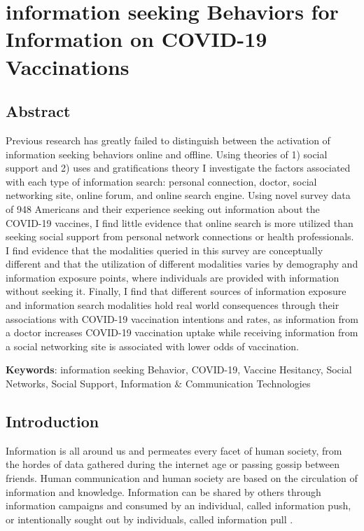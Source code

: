 \hypertarget{paper-2}{%
\chapter{information seeking Behaviors for Information on COVID-19 Vaccinations}\label{paper-2}}

\hypertarget{abstract}{%
\section{Abstract}\label{abstract}}

Previous research has greatly failed to distinguish between the activation of
information seeking behaviors online and offline. Using theories of 1) social
support and 2) uses and gratifications theory I investigate the factors
associated with each type of information search: 
personal connection, doctor, social networking site, online forum, and online
search engine. Using novel survey data of 948 Americans and their experience
seeking out information about the COVID-19 vaccines, I find little evidence that
online search is more utilized than seeking social support from personal network
connections or health professionals. I find evidence that the modalities queried
in this survey are conceptually different and that the utilization of different
modalities varies by demography and information exposure points, where
individuals are provided with information without seeking it. Finally, I find that
different sources of information exposure and information search modalities hold
real world consequences through their associations with COVID-19 vaccination
intentions and rates, as information from a doctor increases COVID-19
vaccination uptake while receiving information from a social networking site
is associated with lower odds of vaccination.

\textbf{Keywords}: information seeking Behavior, COVID-19, Vaccine Hesitancy, Social Networks, Social Support, Information \& Communication Technologies

\hypertarget{intro-1}{%
\section{Introduction}\label{intro-1}}

Information is all around us and permeates every facet of human society, from
the hordes of data gathered during the internet age or passing gossip between
friends. Human communication and human society are based on the circulation of
information and knowledge. Information can be shared by others through
information campaigns and consumed by an individual, called information push, or
intentionally sought out by individuals, called information pull
\citep{cybenkoFoundationsInformationPush1999}.

